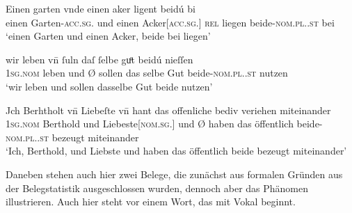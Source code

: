 \begin{exe}
\ex \label{ex:vvfinctrl}
	\begin{xlist}
	\ex \label{ex:vvfinctrl_1}
		\gll Einen garten vnde einen aker {} ligent beidú bi \textelp{} \\	
			einen Garten-\textsc{acc.sg.\MascI} und einen
				Acker[\textsc{acc.sg.\MascI}] \textsc{rel\subI} liegen
				beide-\textsc{nom.pl.\NeutI.st} bei {} \\
		\trans `einen Garten und einen Acker,  beide bei
			\textelp{} liegen'
			\parencites(Nr.~3249, Freiburg i.\,Br., 1299)[417,4--5]{cao4}

	\ex \label{ex:vvfinctrl_2}
		\gll wir leben \textelp{} vn̄ {} ſuln daſ ſelbe guͦt beidú nieſſen \\
			\textsc{1sg\subMF.nom} leben {} und Ø\subMF{} sollen das selbe Gut
				beide-\textsc{nom.pl.\NeutMF.st} nutzen \\
		\trans `wir leben \textelp{} und  sollen
			dasselbe Gut beide nutzen'
			\parencites(Nr.~3376, Neuenburg am Rhein, Kr.~Breisgau-Hochschwarzwald, 1299)[493,21--22]{cao4}

	\ex \label{ex:vvfinctrl_3}
		\gll Jch Berhtholt vn̄ Liebeſte \textelp{} vn̄ {} hant das offenliche
				bediv veriehen miteinander \\
			\textsc{1sg\subM.nom} Berthold und Liebeste[\textsc{nom.sg.\FemF}]
				{} und Ø\subMF{} haben das öffentlich
				beide-\textsc{nom.pl.\NeutMF.st} bezeugt miteinander \\
		\trans `Ich, Berthold, und Liebste \textelp{} und 
			haben das öffentlich beide bezeugt miteinander'
			\parencites(Nr.~N~150, Kl.~Niedermünster, Dépt.~Bas-Rhin, 1277)[108,31--32]{cao5}

	\end{xlist}
\end{exe}

Daneben stehen auch hier zwei Belege, die zunächst aus formalen Gründen aus der
Beleg\-statistik ausgeschlossen wurden, dennoch aber das Phänomen illustrieren.
Auch hier steht  vor einem Wort, das mit Vokal beginnt.

